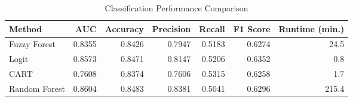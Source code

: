 \begin{table}[hbt!]
\centering
\caption{Classification Performance Comparison} 
\label{tab:turn-perf}
\begin{tabular}{lrrrrrr}
 Method & AUC & Accuracy & Precision & Recall & F1 Score & Runtime (min.) \\ 
  \midrule
Fuzzy Forest & 0.8355 & 0.8426 & 0.7947 & 0.5183 & 0.6274 & 24.5 \\ 
  Logit & 0.8573 & 0.8471 & 0.8147 & 0.5206 & 0.6352 & 0.8 \\ 
  CART & 0.7608 & 0.8374 & 0.7606 & 0.5315 & 0.6258 & 1.7 \\ 
  Random Forest & 0.8604 & 0.8483 & 0.8381 & 0.5041 & 0.6296 & 215.4 \\ 
  \end{tabular}
\end{table}

